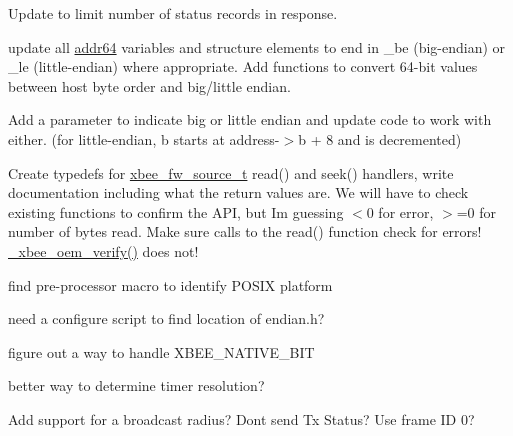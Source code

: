 \begin{DoxyRefList}
Update to limit number of status records in response.  
\item[\label{todo__todo000026}%
\Hypertarget{todo__todo000026}%
Class \hyperlink{unionaddr64}{addr64} ]update all \hyperlink{unionaddr64}{addr64} variables and structure elements to end in \+\_\+be (big-\/endian) or \+\_\+le (little-\/endian) where appropriate. Add functions to convert 64-\/bit values between host byte order and big/little endian.  
\item[\label{todo__todo000005}%
\Hypertarget{todo__todo000005}%
Global \hyperlink{group__wpan__types_ga448782f4aed0821758969b47221417ed}{addr64\+\_\+format} (char F\+AR $\ast$buffer, const \hyperlink{unionaddr64}{addr64} F\+AR $\ast$address)]Add a parameter to indicate big or little endian and update code to work with either. (for little-\/endian, b starts at address-\/$>$b + 8 and is decremented) 
\item[\label{todo__todo000027}%
\Hypertarget{todo__todo000027}%
File \hyperlink{firmware_8h}{firmware.h} ]Create typedefs for \hyperlink{structxbee__fw__source__t}{xbee\+\_\+fw\+\_\+source\+\_\+t} read() and seek() handlers, write documentation including what the return values are. We will have to check existing functions to confirm the A\+PI, but I\textquotesingle{}m guessing $<$0 for error, $>$=0 for number of bytes read. Make sure calls to the read() function check for errors! \hyperlink{group__xbee__firmware_ga06368ad0d6cc0d4e92dbf36f8b233f90}{\+\_\+xbee\+\_\+oem\+\_\+verify()} does not!  
\item[\label{todo__todo000028}%
\Hypertarget{todo__todo000028}%
File \hyperlink{platform_8h}{platform.h} ]find pre-\/processor macro to identify P\+O\+S\+IX platform  
\item[\label{todo__todo000029}%
\Hypertarget{todo__todo000029}%
File \hyperlink{platform__posix_8h}{platform\+\_\+posix.h} ]need a configure script to find location of endian.\+h? 

figure out a way to handle X\+B\+E\+E\+\_\+\+N\+A\+T\+I\+V\+E\+\_\+B\+IT 

better way to determine timer resolution?  
\item[\label{todo__todo000024}%
\Hypertarget{todo__todo000024}%
Global \hyperlink{group__wpan__aps_ga505477d0257efe527747c6d1f561cd6c}{wpan\+\_\+endpoint\+\_\+send\+\_\+fn} )(const \hyperlink{structwpan__envelope__t}{wpan\+\_\+envelope\+\_\+t} F\+AR $\ast$envelope, uint16\+\_\+t flags)]Add support for a broadcast radius? Don\textquotesingle{}t send Tx Status? Use frame ID 0?


\end{DoxyRefList}
